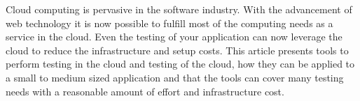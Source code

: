 Cloud computing is pervasive in the software industry.
With the advancement of web technology it is now possible to fulfill most of the computing needs as a service
in the cloud.
Even the testing of your application can now leverage the cloud to reduce the infrastructure and setup costs.
This article presents tools to perform testing in the cloud and testing of the cloud, how they can
be applied to a small to medium sized application and that the tools can cover many testing needs with a reasonable
amount of effort and infrastructure cost.
